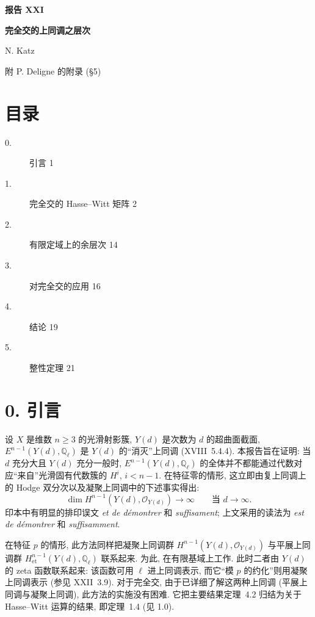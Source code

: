 \clearpage
\ExposeTOC
\begin{center}
{\Large\bfseries 报告 XXI}\par
\vspace{1.5cm}
{\Large\bfseries 完全交的上同调之层次}\par
\vspace{0.8cm}
{\large N. Katz}\par
\vspace{0.5cm}
附 P. Deligne 的附录 (\S 5)
\end{center}

\vspace{1.5cm}
\section*{目录}
\begin{description}
\item[0.] 引言 \hfill 1
\item[1.] 完全交的 Hasse--Witt 矩阵 \hfill 2
\item[2.] 有限定域上的余层次 \hfill 14
\item[3.] 对完全交的应用 \hfill 16
\item[4.] 结论 \hfill 19
\item[5.] 整性定理 \hfill 21
\end{description}

\clearpage
\section*{0. 引言}

设 $X$ 是维数 $n\geq3$ 的光滑射影簇, $Y(d)$ 是次数为 $d$ 的超曲面截面,
$E^{n-1}(Y(d),\mathbb Q_\ell)$ 是 $Y(d)$ 的“消灭”上同调
(XVIII~5.4.4). 本报告旨在证明: 当 $d$ 充分大且 $Y(d)$ 充分一般时,
$E^{n-1}(Y(d),\mathbb Q_\ell)$ 的全体并不都能通过代数对应“来自”光滑固有代数簇的
$H^i$, $i<n-1$. 在特征零的情形, 这立即由复上同调上的 Hodge 双分次以及凝聚上同调中的下述事实得出:
\begin{equation*}
\dim H^{n-1}(Y(d),\mathcal O_{Y(d)})\longrightarrow\infty
\qquad\text{当 }d\longrightarrow\infty.
\end{equation*}
印本中有明显的排印误文 \emph{et de démontrer} 和 \emph{suffisament};
上文采用的读法为 \emph{est de démontrer} 和 \emph{suffisamment}.

在特征 $p$ 的情形, 此方法同样把凝聚上同调群
$H^{n-1}(Y(d),\mathcal O_{Y(d)})$ 与平展上同调群
$H^{n-1}_{\mathrm{et}}(Y(d),\mathbb Q_\ell)$ 联系起来. 为此, 在有限基域上工作.
此时二者由 $Y(d)$ 的 zeta 函数联系起来: 该函数可用 $\ell$ 进上同调表示,
而它“模 $p$ 的约化”则用凝聚上同调表示 (参见 XXII~3.9).
对于完全交, 由于已详细了解这两种上同调 (平展上同调与凝聚上同调),
此方法的实施没有困难. 它把主要结果定理~4.2 归结为关于 Hasse--Witt 运算的结果,
即定理~1.4 (见 1.0).

